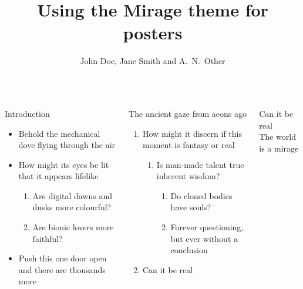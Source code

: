\documentclass{beamer}
\title{Using the Mirage theme for posters}
\author{John Doe, Jane Smith and A.~N.~Other }
\begin{document}
\begin{frame}

\begin{columns}[T]
\begin{block}{Introduction}

\begin{itemize}
    \item Behold the mechanical dove \faDove{} flying through the air 
    \item How might its eyes be lit \faEye[regular] that it appears lifelike

\begin{enumerate}
    \item Are digital dawns and dusks \faCloudSun{} more colourful? \faCloudMoon
    \item Are bionic lovers \faGrinHearts{} more faithful? \faGrin*[regular]
\end{enumerate}

    \item Push this one door open \faDoorOpen{} and there are thousands more \faDoorClosed{\small\faDoorClosed}{\footnotesize\faDoorClosed}{\scriptsize\faDoorClosed}{\tiny\faDoorClosed}
\end{itemize}

\end{block}

\begin{block}{The ancient gaze from aeons ago}
    \begin{enumerate}
        \item How might it discern if this moment is fantasy or real
        \begin{enumerate}
	        \item Is man-made talent true inherent wisdom?
	        \begin{enumerate}
		        \item Do cloned bodies have souls?
		        \item Forever questioning, but ever without a conclusion
	        \end{enumerate}
        \end{enumerate}
        \item \alert{Can it be real}
    \end{enumerate}
\end{block}

\begin{pullquote}
    Can it be real\\
    The world is a mirage
\end{pullquote}


\end{columns}
\end{frame}
\end{document}
